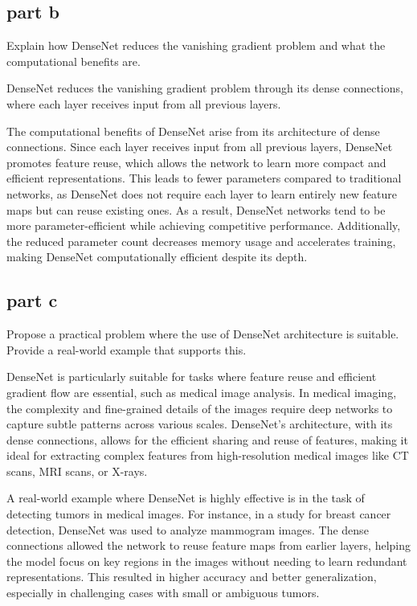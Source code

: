 \subsection{part b}
Explain how DenseNet reduces the vanishing gradient problem and what the computational benefits are.
\begin{qsolve}
    \begin{qsolve}[]
        DenseNet reduces the vanishing gradient problem through its dense connections, where each layer receives input from all previous layers.

        The computational benefits of DenseNet arise from its architecture of dense connections. Since each layer receives input from all previous layers, DenseNet promotes feature reuse, which allows the network to learn more compact and efficient representations. 
        \splitqsolve[\splitqsolve]
        This leads to fewer parameters compared to traditional networks, as DenseNet does not require each layer to learn entirely new feature maps but can reuse existing ones.
        As a result, DenseNet networks tend to be more parameter-efficient while achieving competitive performance. Additionally, the reduced parameter count decreases memory usage and accelerates training, making DenseNet computationally efficient despite its depth.
    \end{qsolve}
\end{qsolve}
\subsection{part c}
Propose a practical problem where the use of DenseNet architecture is suitable. Provide a real-world example that supports this.
\begin{qsolve}
    \begin{qsolve}[]
        DenseNet is particularly suitable for tasks where feature reuse and efficient gradient flow are essential, such as medical image analysis. In medical imaging, the complexity and fine-grained details of the images require deep networks to capture subtle patterns across various scales. DenseNet's architecture, with its dense connections, allows for the efficient sharing and reuse of features, making it ideal for extracting complex features from high-resolution medical images like CT scans, MRI scans, or X-rays. 

        A real-world example where DenseNet is highly effective is in the task of detecting tumors in medical images. For instance, in a study for breast cancer detection, DenseNet was used to analyze mammogram images. The dense connections allowed the network to reuse feature maps from earlier layers, helping the model focus on key regions in the images without needing to learn redundant representations. This resulted in higher accuracy and better generalization, especially in challenging cases with small or ambiguous tumors.

    \end{qsolve}
\end{qsolve}

